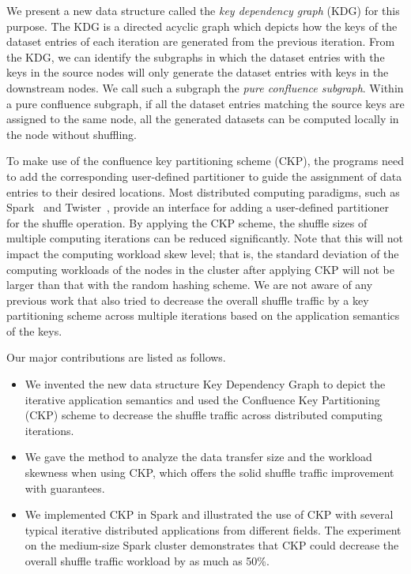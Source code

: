 \documentclass[10pt,journal,compsoc]{IEEEtran}
\begin{document}
We present a new data structure called the \emph{key dependency graph} (KDG) for this purpose.
The KDG is a directed acyclic graph which depicts how the keys of the
dataset entries of each iteration are generated from the previous iteration.
From the KDG, we can identify the subgraphs in which the dataset
entries with the keys in the source nodes will only generate the dataset
entries with keys in the downstream nodes. We call such a subgraph
the \emph{pure confluence subgraph}.
Within a pure confluence subgraph, if all the dataset entries matching
the source keys are assigned to the same node, all the generated
datasets can be computed locally in the node without shuffling.

To make use of the confluence key partitioning scheme (CKP), the
programs need to add the corresponding user-defined partitioner
to guide the assignment of data entries to their desired locations.
Most distributed computing paradigms, such as Spark~\cite{zaharia2012resilient} and Twister~\cite{ekanayake2010twister},
provide an interface for adding a user-defined partitioner for the shuffle
operation.
By applying the CKP scheme, the shuffle sizes of multiple computing
iterations can be reduced significantly. %
Note that this will not impact the computing workload skew level; that is,
the standard deviation of the computing workloads of the
nodes in the cluster after applying CKP will not be larger than that
with the random hashing scheme.
We are not aware of any previous work
that also tried to decrease the overall
shuffle traffic by a key partitioning scheme across multiple
iterations based on the application semantics of the keys.

Our major contributions are listed as follows.
\begin{itemize}
\setlength{\itemsep}{0pt}
\setlength{\parskip}{0pt}
\setlength{\parsep}{0pt}
\item We invented the new data structure Key Dependency Graph to depict the iterative application semantics 
and used the Confluence Key Partitioning (CKP) scheme to decrease the shuffle traffic
across distributed computing iterations.

\item We gave the method to analyze the data transfer size and the workload skewness when using CKP, which offers the solid shuffle traffic improvement with guarantees. 

\item We implemented CKP in Spark and illustrated the use of CKP with several typical iterative distributed applications from different fields. 
The experiment on the medium-size Spark cluster demonstrates that CKP could decrease the overall shuffle traffic workload by as much as 50\%.  
\end{itemize}
\end{document}
